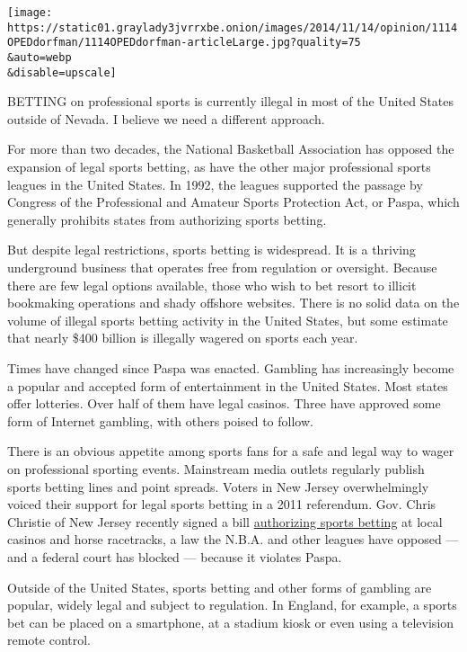 \texttt{[image: https://static01.graylady3jvrrxbe.onion/images/2014/11/14/opinion/1114OPEDdorfman/1114OPEDdorfman-articleLarge.jpg?quality=75\\\&auto=webp\\\&disable=upscale]}

BETTING on professional sports is currently illegal in most of the
United States outside of Nevada. I believe we need a different approach.

For more than two decades, the National Basketball Association has
opposed the expansion of legal sports betting, as have the other major
professional sports leagues in the United States. In 1992, the leagues
supported the passage by Congress of the Professional and Amateur Sports
Protection Act, or Paspa, which generally prohibits states from
authorizing sports betting.

But despite legal restrictions, sports betting is widespread. It is a
thriving underground business that operates free from regulation or
oversight. Because there are few legal options available, those who wish
to bet resort to illicit bookmaking operations and shady offshore
websites. There is no solid data on the volume of illegal sports betting
activity in the United States, but some estimate that nearly \$400
billion is illegally wagered on sports each year.

Times have changed since Paspa was enacted. Gambling has increasingly
become a popular and accepted form of entertainment in the United
States. Most states offer lotteries. Over half of them have legal
casinos. Three have approved some form of Internet gambling, with others
poised to follow.

There is an obvious appetite among sports fans for a safe and legal way
to wager on professional sporting events. Mainstream media outlets
regularly publish sports betting lines and point spreads. Voters in New
Jersey overwhelmingly voiced their support for legal sports betting in a
2011 referendum. Gov. Chris Christie of New Jersey recently signed a
bill
\href{http://www.nytimes3xbfgragh.onion/2014/09/09/nyregion/christie-unilaterally-lifts-sports-betting-prohibition.html}{authorizing
sports betting} at local casinos and horse racetracks, a law the N.B.A.
and other leagues have opposed --- and a federal court has blocked ---
because it violates Paspa.

Outside of the United States, sports betting and other forms of gambling
are popular, widely legal and subject to regulation. In England, for
example, a sports bet can be placed on a smartphone, at a stadium kiosk
or even using a television remote control.

